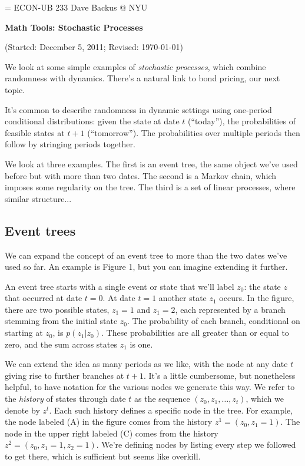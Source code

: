 \documentclass[11pt]{article}
\begin{document}
\parskip=\bigskipamount
\parindent=0.0in
\thispagestyle{empty}
{\large ECON-UB 233 \hfill Dave Backus @ NYU}

\bigskip\bigskip
\centerline{\Large \bf Math Tools:  Stochastic Processes}
\centerline{(Started: December 5, 2011; Revised: \today)}

\bigskip
We look at some simple examples of {\it stochastic processes\/},
which combine randomness with dynamics.
There's a natural link to bond pricing, our next topic.

It's common to describe randomness in dynamic settings using
one-period conditional distributions:
given the state at date $t$ (``today''),
the probabilities of feasible states at $t+1$ (``tomorrow'').
The probabilities over multiple periods then follow by stringing
periods together.


We look at three examples.
The first is an event tree,
the same object we've used before but with more than two dates.
The second is a Markov chain, which imposes some regularity
on the tree.
The third is a set of linear processes, where similar structure...


\subsection*{Event trees}

We can expand the concept of an event tree to more than the two
dates we've used so far.
An example is Figure 1, but you can imagine extending it further.

An event tree starts with a single event or state that we'll label $z_0$:
the state $z$ that occurred at date $t=0$.
At date $t=1$ another state $z_1$ occurs.
In the figure, there are two possible states, $z_1 = 1$ and $z_1 = 2$,
each represented by a branch stemming from the initial state $z_0$.
The probability of each branch, conditional on starting at $z_0$,
is $p(z_1| z_0)$. These probabilities are all greater than or equal to zero,
and the sum across states $z_1$ is one.

We can extend the idea as many periods as we like,
with the node at any date $t$ giving rise to further branches at $t+1$.
It's a little cumbersome, but nonetheless helpful,
to have notation for the various nodes we generate this way.
We refer to the {\it history\/} of states through date $t$
as the sequence $(z_0, z_1, \ldots, z_t)$, which we denote by $z^t$.
Each such history defines a specific node in the tree.
For example, the node labeled (A) in the figure comes from the history
$z^1 = (z_0, z_1 = 1)$.
The node in the upper right labeled (C)
comes from the history $z^2 = (z_0, z_1 = 1, z_2 = 1)$.
We're defining nodes by listing every step we followed to get there,
which is sufficient but seems like overkill.
\end{document}
